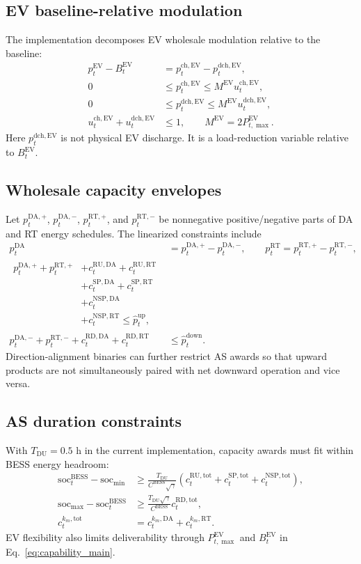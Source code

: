 \documentclass[final,5p,times]{elsarticle}
\newcommand{\EV}{\mathrm{EV}}
\newcommand{\BESS}{\mathrm{BESS}}
\newcommand{\DA}{\mathrm{DA}}
\newcommand{\RT}{\mathrm{RT}}
\newcommand{\soc}{\mathrm{soc}}
\newcommand{\RU}{\mathrm{RU}}
\newcommand{\RD}{\mathrm{RD}}
\newcommand{\SP}{\mathrm{SP}}
\newcommand{\NSP}{\mathrm{NSP}}
\newcommand{\ch}{\mathrm{ch}}
\newcommand{\dch}{\mathrm{dch}}
\newcommand{\up}{\mathrm{up}}
\newcommand{\down}{\mathrm{down}}
\newcommand{\tot}{\mathrm{tot}}
\newcommand{\DU}{\mathrm{DU}}
\begin{document}
\subsection{EV baseline-relative modulation}
The implementation decomposes EV wholesale modulation relative to the baseline:
\begin{align}
p_t^{\EV}-B_t^{\EV} &= p_t^{\ch,\EV}-p_t^{\dch,\EV},\label{eq:app_ev_baseline_decomp}\\
0&\le p_t^{\ch,\EV}\le M^{\EV}u_t^{\ch,\EV},\label{eq:app_ev_big_m_ch}\\
0&\le p_t^{\dch,\EV}\le M^{\EV}u_t^{\dch,\EV},\label{eq:app_ev_big_m_dch}\\
u_t^{\ch,\EV}+u_t^{\dch,\EV}&\le 1,\qquad M^{\EV}=2P_{t,\max}^{\EV}.\label{eq:app_ev_big_m_sum}
\end{align}
Here $p_t^{\dch,\EV}$ is not physical EV discharge. It is a load-reduction variable relative to $B_t^{\EV}$.

\subsection{Wholesale capacity envelopes}
Let $p_t^{\DA,+}$, $p_t^{\DA,-}$, $p_t^{\RT,+}$, and $p_t^{\RT,-}$ be nonnegative positive/negative parts of DA and RT energy schedules. The linearized constraints include
\begin{align}
p_t^{\DA}&=p_t^{\DA,+}-p_t^{\DA,-},\qquad
p_t^{\RT}=p_t^{\RT,+}-p_t^{\RT,-},\label{eq:app_posneg}\\
\begin{split}
p_t^{\DA,+}+p_t^{\RT,+} &+c_t^{\RU,\DA}+c_t^{\RU,\RT}\\
&+c_t^{\SP,\DA}+c_t^{\SP,\RT}\\
&+c_t^{\NSP,\DA}\\
&+c_t^{\NSP,\RT}\le \hat p_t^{\up},
\end{split}\label{eq:app_up_env}\\
p_t^{\DA,-}+p_t^{\RT,-}+c_t^{\RD,\DA}+c_t^{\RD,\RT}&\le \hat p_t^{\down}.\label{eq:app_down_env}
\end{align}
Direction-alignment binaries can further restrict AS awards so that upward products are not simultaneously paired with net downward operation and vice versa.

\subsection{AS duration constraints}
With $T_{\DU}=0.5$ h in the current implementation, capacity awards must fit within BESS energy headroom:
\begin{align}
\soc_t^{\BESS}-\soc_{\min}&\ge \frac{T_{\DU}}{C^{\BESS}\sqrt{\gamma}}
\left(c_t^{\RU,\tot}+c_t^{\SP,\tot}+c_t^{\NSP,\tot}\right),\label{eq:app_as_up_duration}\\
\soc_{\max}-\soc_t^{\BESS}&\ge \frac{T_{\DU}\sqrt{\gamma}}{C^{\BESS}}c_t^{\RD,\tot},\label{eq:app_as_down_duration}\\
c_t^{k_m,\tot}&=c_t^{k_m,\DA}+c_t^{k_m,\RT}.\label{eq:app_as_tot}
\end{align}
EV flexibility also limits deliverability through $P_{t,\max}^{\EV}$ and $B_t^{\EV}$ in Eq.~\eqref{eq:capability_main}.
\end{document}
